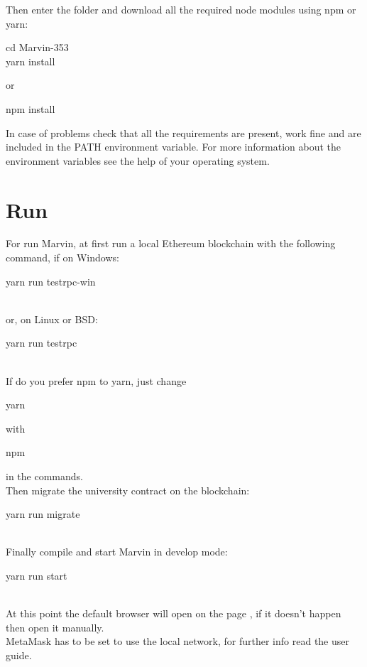 \documentclass[ManualeSviluppatore.tex]{subfiles}
\begin{document}
Then enter the folder and download all the required node modules using npm or yarn: \\
\begin{ttfamily}
	cd Marvin-353 \\
	yarn install \\
\end{ttfamily}
or \\
\begin{ttfamily}
npm install \\
\end{ttfamily}

In case of problems check that all the requirements are present, work fine and are included in the PATH environment variable. For more information about the environment variables see the help of your operating system. \\


\section{Run}
For run Marvin, at first run a local Ethereum blockchain with the following command, if on Windows: \\
\begin{ttfamily} yarn run testrpc-win \end{ttfamily} \\
or, on Linux or BSD: \\
\begin{ttfamily} yarn run testrpc \end{ttfamily} \\
If do you prefer npm to yarn, just change \begin{ttfamily}yarn\end{ttfamily}  with \begin{ttfamily}npm\end{ttfamily} in the commands.\\

Then migrate the university contract on the blockchain: \\
\begin{ttfamily} yarn run migrate \end{ttfamily} \\
Finally compile and start Marvin in develop mode: \\
\begin{ttfamily} yarn run start \end{ttfamily} \\

At this point the default browser will open on the page , if it doesn't happen then open it manually.\\
MetaMask has to be set to use the local network, for further info read the user guide.
\end{document}
